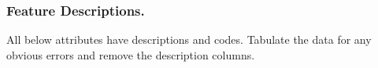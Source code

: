 \documentclass[]{article}
\newenvironment{Shaded}{\begin{snugshade}}{\end{snugshade}}
\newcommand{\KeywordTok}[1]{\textcolor[rgb]{0.13,0.29,0.53}{\textbf{#1}}}
\newcommand{\NormalTok}[1]{#1}
\newcommand{\OperatorTok}[1]{\textcolor[rgb]{0.81,0.36,0.00}{\textbf{#1}}}
\newcommand{\StringTok}[1]{\textcolor[rgb]{0.31,0.60,0.02}{#1}}
\begin{document}
\begin{Shaded}
\end{Shaded}

\hypertarget{feature-descriptions.}{%
\subsubsection{Feature Descriptions.}\label{feature-descriptions.}}

All below attributes have descriptions and codes. Tabulate the data for
any obvious errors and remove the description columns.

\begin{Shaded}
\end{Shaded}
\end{document}
